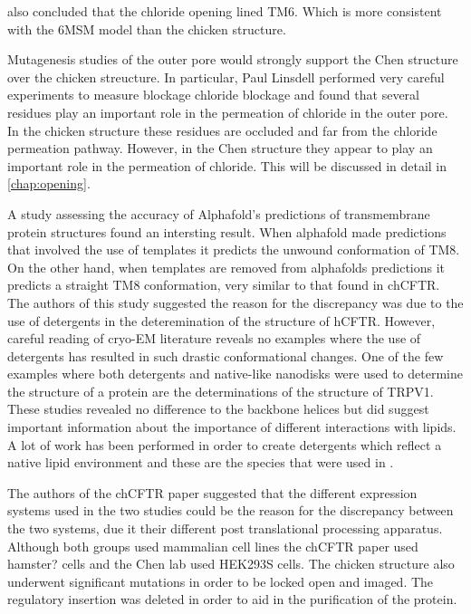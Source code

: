\cite{gao2015} also concluded that the chloride opening lined TM6. Which is more consistent with the 6MSM model than the chicken structure.

Mutagenesis studies of the outer pore would strongly support the Chen structure over the chicken streucture. In particular, Paul Linsdell performed very careful experiments to measure blockage chloride blockage and found that several residues play an important role in the permeation of chloride in the outer pore. In the chicken structure these residues are occluded and far from the chloride permeation pathway. However, in the Chen structure they appear to play an important role in the permeation of chloride. This will be discussed in detail in \ref{chap:opening}.

A study assessing the accuracy of Alphafold's predictions of transmembrane protein structures found an intersting result. When alphafold made predictions that involved the use of templates it predicts the unwound conformation of TM8. On the other hand, when templates are removed from alphafolds predictions it predicts a straight TM8 conformation, very similar to that found in chCFTR. The authors of this study suggested the reason for the discrepancy was due to the use of detergents in the deteremination of the structure of hCFTR. However, careful reading of cryo-EM literature reveals no examples where the use of detergents has resulted in such drastic conformational changes. One of the few examples where both detergents and native-like nanodisks were used to determine the structure of a protein are the determinations of the structure of TRPV1. These studies revealed no difference to the backbone helices but did suggest important information about the importance of different interactions with lipids. A lot of work has been performed in order to create detergents which reflect a native lipid environment and these are the species that were used in . 

The authors of the chCFTR paper suggested that the different expression systems used in the two studies could be the reason for the discrepancy between the two systems, due it their different post translational processing apparatus. Although both groups used mammalian cell lines the chCFTR paper used hamster? cells \cite{aleksandrov2015} and the Chen lab used HEK293S cells. The chicken structure also underwent significant mutations in order to be locked open and imaged. The regulatory insertion was deleted in order to aid in the purification of the protein. 

